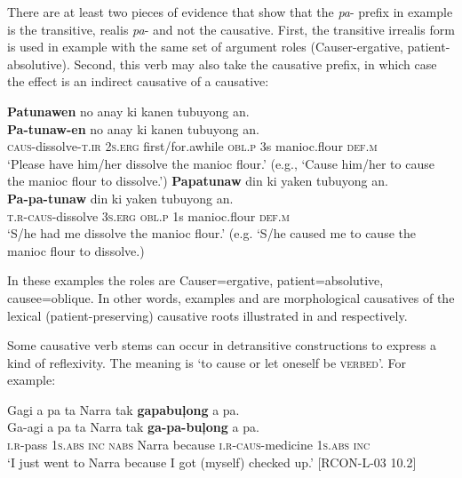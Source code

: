 There are at least two pieces of evidence that show that the \textit{pa}{}- prefix in example  is the transitive, realis \textit{pa}{}- and not the causative. First, the transitive irrealis form is used in example  with the same set of argument roles (Causer-ergative, patient-absolutive). Second, this verb may also take the causative prefix, in which case the effect is an indirect causative of a causative:

\ea
\label{bkm:Ref395126311}
\textbf{Patunawen}  no  anay  ki  kanen  tubuyong  an. \\\smallskip
\gll \textbf{Pa-tunaw-en}  no  anay  ki  kanen  tubuyong  an. \\
\textsc{caus}-dissolve-\textsc{t.ir}  2\textsc{s.erg} first/for.awhile \textsc{obl.p}  3s  manioc.flour   \textsc{def.m} \\
\glt ‘Please have him/her dissolve the manioc flour.’ (e.g., ‘Cause him/her to cause the manioc flour to dissolve.’)
\z
\ea
\label{bkm:Ref122957467}
\textbf{Papatunaw}  din  ki  yaken  tubuyong  an. \\\smallskip
\gll \textbf{Pa-pa-tunaw}  din  ki  yaken  tubuyong  an. \\
\textsc{t.r-caus}-dissolve  3\textsc{s.erg}  \textsc{obl.p}  1s  manioc.flour   \textsc{def.m} \\
\glt ‘S/he had me dissolve the manioc flour.’ (e.g. ‘S/he caused me to cause the manioc flour to dissolve.)
\z

In these examples the roles are Causer=ergative, patient=absolutive, causee=ob\-lique. In other words, examples  and  are morphological causatives of the lexical (patient-preserving) causative roots illustrated in  and  respectively.

Some causative verb stems can occur in detransitive constructions to express a kind of reflexivity. The meaning is ‘to cause or let oneself be \textsc{verbed}’. For example:

\ea
Gagi  a  pa  ta  Narra  tak  \textbf{gapabuļong} a  pa. \\\smallskip
\gll Ga-agi  a  pa  ta  Narra  tak  \textbf{ga-pa-buļong} a  pa. \\
\textsc{i.r}-pass  1\textsc{s.abs}  \textsc{inc}  \textsc{nabs}  Narra  because  \textsc{i.r-caus}-medicine  1\textsc{s.abs}  \textsc{inc} \\
\glt ‘I just went to Narra because I got (myself) checked up.’ [RCON-L-03 10.2]
\z

